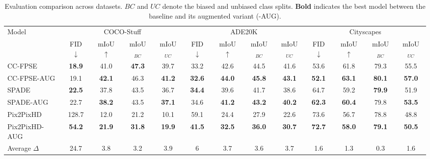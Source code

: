 \documentclass[final]{cvpr}
\newcommand\+{\mkern4mu}
\begin{document}
\begin{table*}[t]
	\setlength{\tabcolsep}{0.05em}
	\renewcommand{\arraystretch}{1.0}
	
\centering
\begin{tabular}{@{}l@{\hspace{0.2cm}}cccc@{\hspace{0.5cm}}cccc@{\hspace{0.5cm}}cccc@{}}


\multirow{2}{*}{ Model }& \multicolumn{4}{c}{ COCO-Stuff} & \multicolumn{4}{c}{ ADE20K} & \multicolumn{4}{c}{ Cityscapes} \tabularnewline  
			
		&	 FID $\downarrow$&  mIoU $\uparrow$&  mIoU$_{BC}$&  mIoU$_{UC}$ &  FID $\downarrow$&  mIoU $\uparrow$&  mIoU$_{BC}$&  mIoU$_{UC}$ & FID $\downarrow$&  mIoU $\uparrow$&  mIoU$_{BC}$&  mIoU$_{UC}$
			\tabularnewline  


			\cmidrule(lr){2-5}  	\cmidrule(lr){6-9}  	\cmidrule(lr){10-13} 
			
		  CC-FPSE &  \textbf{18.9} &  41.0 &  \textbf{47.3} &  39.7  &  33.2 &  42.6 &  44.5 &  41.6 &  53.6 &  61.8&  79.3&  55.5  \tabularnewline	
		 
		 
		  CC-FPSE-AUG &  19.1 & 	\textbf{42.1}&  46.3&  \textbf{41.2} &  \textbf{32.6} &  \textbf{44.0} &  \textbf{45.8} &  \textbf{43.1} &  \textbf{52.1}&  \textbf{63.1}&  \textbf{80.1}&  \textbf{57.0}\tabularnewline[0.1cm]  
			
		  SPADE &  \textbf{22.5}&  37.8 &  43.5 &  36.7 &  \textbf{34.4} &  39.6 &  41.7 &  38.6 &  64.7&  59.2&  \textbf{79.9}&  51.9 \tabularnewline
		   SPADE-AUG&  22.7&  \textbf{38.2}&  43.5 &  \textbf{37.1} &  34.6&  \textbf{41.2} &  \textbf{43.2} &  \textbf{40.2} &  \textbf{62.3}&  \textbf{60.4}&  79.8&  \textbf{53.5}\tabularnewline[0.1cm] 
			
		 Pix2PixHD &  128.7 &  12.0 &  21.2 &  10.1 &  59.1 &  24.4 &  27.9 &  22.6 &  73.6&  56.7&  78.8&  48.8 \tabularnewline 
		 Pix2PixHD-AUG &  \textbf{54.2}&  \textbf{21.9}&  \textbf{31.8}&  \textbf{19.9} &  \textbf{41.5} &  \textbf{32.5} &  \textbf{36.0} &  \textbf{30.7} &  \textbf{72.7}&  \textbf{58.0}&  \textbf{79.1}&  \textbf{50.5}  \tabularnewline
		 
		 	\cmidrule(lr){2-5}  	\cmidrule(lr){6-9}  	\cmidrule(lr){10-13} 
		 	
		 Average $\Delta$ & 24.7  &  3.8 & 3.2  &  3.9 & 6  & 3.7  & 3.6  &  3.7 &  1.6&  1.3&  0.3 &  1.6 \tabularnewline 
			
		
		\end{tabular}\vspace{0.5em}
	\caption{Evaluation comparison across datasets. ${BC}$ and ${UC}$ denote the biased and unbiased class splits. \textbf{Bold} indicates the best model between the baseline and its augmented variant (-AUG).}
	\label{tab:aug}
\vspace{-1.25em}
\end{table*}
 
\end{document}

